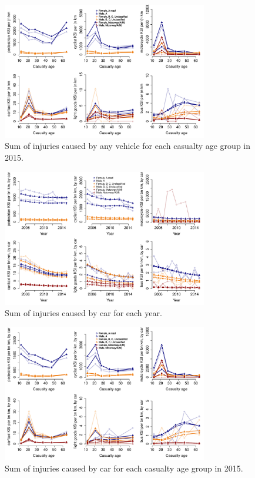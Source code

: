 \documentclass{article}
\begin{document}
\begin{figure}[H]
\centering
\includegraphics[width=0.8\textwidth]{pred6Age2015.pdf}
\caption{\small Sum of injuries caused by any vehicle for each casualty age group in 2015.}
\label{pred6Age2015}
\end{figure}

\begin{figure}[H]
\centering
\includegraphics[width=0.8\textwidth]{pred6yearCar.pdf}
\caption{\small Sum of injuries caused by car for each year.}
\label{pred6yearCar}
\end{figure}

\begin{figure}[H]
\centering
\includegraphics[width=0.8\textwidth]{pred6Age2015Car.pdf}
\caption{\small Sum of injuries caused by car for each casualty age group in 2015.}
\label{pred6Age2015Car}
\end{figure}
\end{document}
